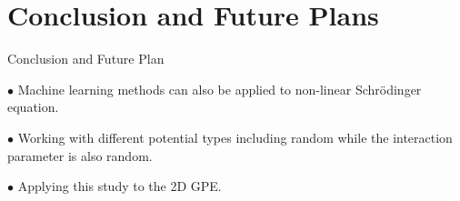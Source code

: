 \documentclass{beamer}
\begin{document}
\section{Conclusion and Future Plans}
\begin{frame}{Conclusion and Future Plan}

$\bullet$ Machine learning methods can also be applied to non-linear
Schrödinger equation.

\vskip 1cm

$\bullet$ Working with different potential types including random while the interaction parameter is also random.

\vskip 1cm

$\bullet$ Applying this study to the 2D GPE.

\end{frame}
\end{document}
